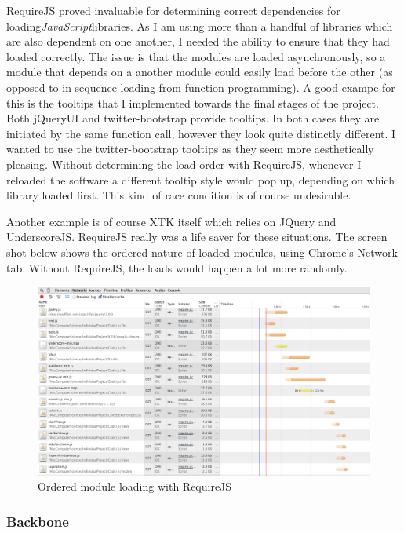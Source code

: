 \documentclass[a4paper,11pt,twoside]{article}
\begin{document}
RequireJS proved invaluable for determining correct dependencies for loading\textit{JavaScript}libraries.
As I am using more than a handful of libraries which are also dependent on one another, I needed the ability to ensure that they had loaded correctly. The issue is that the modules are loaded asynchronously, so a module that depends on a another module could easily load before the other (as opposed to in sequence loading from function programming). A good exampe for this is the tooltips that I implemented towards the final stages of the project. Both jQueryUI and twitter-bootstrap provide tooltips. In both cases they are initiated by the same function call, however they look quite distinctly different. I wanted to use the twitter-bootstrap tooltips as they seem more aesthetically pleasing. Without determining the load order with RequireJS, whenever I reloaded the software a different tooltip style would pop up, depending on which library loaded first. This kind of race condition is of course undesirable.

Another example is of course XTK itself which relies on JQuery and UnderscoreJS. RequireJS really was a life saver for these situations. The screen shot below shows the ordered nature of loaded modules, using Chrome's Network tab. Without RequireJS, the loads would happen a lot more randomly.


\begin{figure}[ht!]
\centering
\includegraphics[width=120mm]{graphics/requireOrder_01.png}
\caption{Ordered module loading with RequireJS}
\label{fig:UIdesign1}
\end{figure}





\subsubsection{Backbone}
\end{document}

